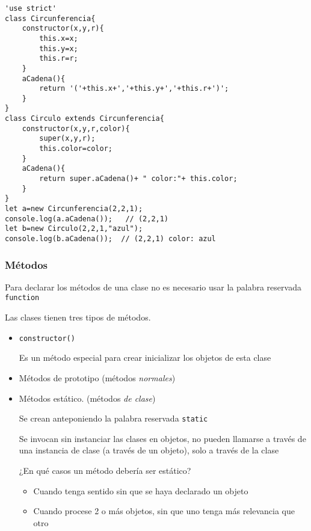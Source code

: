 \documentclass[ucs]{beamer}
\begin{document}
\begin{frame}[fragile]
\frametitle{}
  \begin{scriptsize}
  \begin{verbatim}
'use strict'
class Circunferencia{
    constructor(x,y,r){
        this.x=x;
        this.y=x;
        this.r=r;
    }
    aCadena(){
        return '('+this.x+','+this.y+','+this.r+')';
    }
}
class Circulo extends Circunferencia{
    constructor(x,y,r,color){
        super(x,y,r);
        this.color=color;
    }
    aCadena(){
        return super.aCadena()+ " color:"+ this.color;
    }
}
let a=new Circunferencia(2,2,1);
console.log(a.aCadena());   // (2,2,1)
let b=new Circulo(2,2,1,"azul");
console.log(b.aCadena());  // (2,2,1) color: azul
  \end{verbatim}
  \end{scriptsize}

\end{frame}


\begin{frame}[fragile]
\frametitle{Métodos}
Para declarar los métodos de una clase no es necesario usar la palabra reservada \verb|function|

Las clases tienen tres tipos de métodos.
\begin{itemize}
\item
\verb|constructor()|

Es un método especial para crear inicializar los objetos de esta clase

\item
Métodos de prototipo (métodos \emph{normales})

\item
Métodos estático. (métodos \emph{de clase})

Se crean anteponiendo la palabra reservada
\verb|static|

Se invocan sin instanciar las clases en objetos, no pueden llamarse a través de una instancia
de clase (a través de un objeto), solo a través de la clase

¿En qué casos un método  debería ser estático?

    \begin{itemize}
    \item
Cuando tenga sentido sin que se haya declarado un objeto
    \item
Cuando procese 2 o más objetos, sin que uno tenga más relevancia que otro
    \end{itemize}
\end{itemize}
\end{frame}
\end{document}
